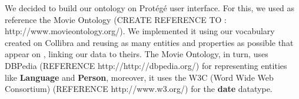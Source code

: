 We decided to build our ontology on Protégé user interface. For this, we used as reference the Movie Ontology \cite{movieontology} (CREATE REFERENCE TO : http://www.movieontology.org/). We implemented it using our vocabulary created on Collibra and reusing as many entities and properties as possible that appear on \cite{movieontology}, linking our data to theirs. The Movie Ontology, in turn, uses DBPedia \cite{dbpedia} (REFERENCE http://http://dbpedia.org/) for representing entities like \textbf{Language} and \textbf{Person}, moreover, it uses the W3C (Word Wide Web Consortium) \cite{w3c} (REFERENCE http://www.w3.org/) for the \textbf{date} datatype.

